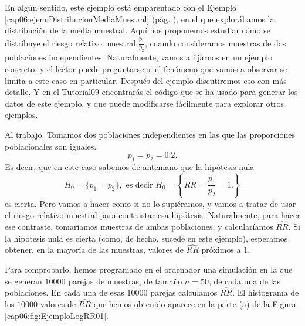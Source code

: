 \begin{ejemplo}
\label{cap09:ejem:TransformandoRiesgoRelativoConLogaritmos}
En algún sentido, este ejemplo está emparentado con el Ejemplo \ref{cap06:ejem:DistribucionMediaMuestral} (pág. \pageref{cap06:ejem:DistribucionMediaMuestral}), en el que explorábamos la distribución de la media muestral. Aquí nos proponemos estudiar cómo se distribuye el riesgo relativo muestral $\frac{\hat p_1}{\hat p_2}$, cuando consideramos muestras de dos poblaciones independientes. Naturalmente, vamos a fijarnos en un ejemplo concreto, y el lector puede preguntarse si el fenómeno que  vamos a observar se limita a este caso en particular. Después del ejemplo discutiremos eso con más detalle. Y en el Tutorial09 encontrarás el código que se ha usado para generar los datos de este ejemplo, y que puede modificarse fácilmente para explorar otros ejemplos.

Al trabajo. Tomamos dos poblaciones independientes en las que las proporciones poblacionales son iguales.
\[p_1=p_2=0.2.\]
Es decir, que en este caso sabemos de antemano que la hipótesis nula
\[H_0=\{p_1=p_2\},\mbox{ es decir }H_0=\left\{RR=\dfrac{p_1}{p_2}=1.\right\}\]
es cierta. Pero vamos a hacer como si no lo supiéramos, y vamos a tratar de usar el riesgo relativo muestral para contrastar esa hipótesis. Naturalmente, para hacer ese contraste, tomaríamos muestras de ambas poblaciones, y calcularíamos $\widehat{RR}$. Si la hipótesis nula es cierta (como, de hecho, sucede en este ejemplo), esperamos obtener, en la mayoría de las muestras, valores de $\widehat{RR}$ próximos a $1$.

Para comprobarlo, hemos programado en el ordenador una simulación en la que se generan $10000$ parejas de muestras, de tamaño $n=50$, de cada una de las poblaciones. En cada una de esas $10000$ parejas calculamos $\widehat{RR}$. El histograma de los $10000$ valores de $\widehat{RR}$ que hemos obtenido aparece en la parte (a) de la Figura \ref{cap06:fig:EjemploLogRR01}.


\end{ejemplo}
